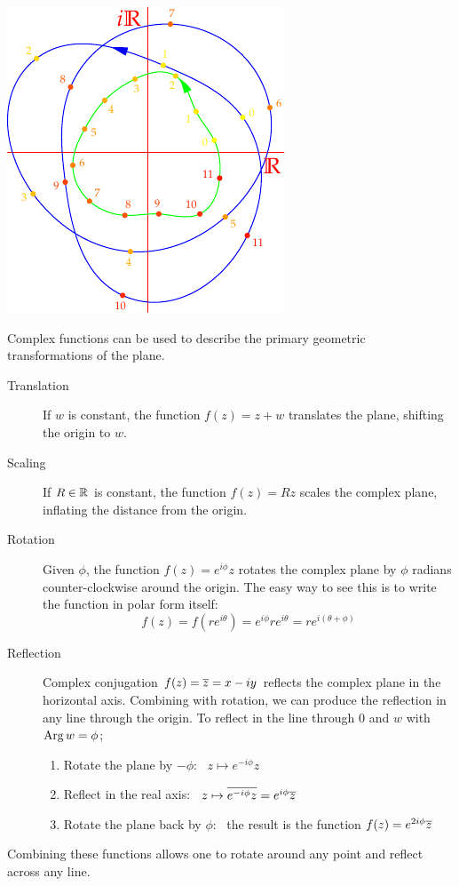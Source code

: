 \begin{examples}{}{}
\begin{minipage}[t]{0.33\linewidth}
\includegraphics{functions-zsq3}
\end{minipage}
\end{examples}

\label{pg:2dgeom}

Complex functions can be used to describe the primary geometric transformations of the plane.
\begin{description}
\item[Translation] If $w$ is constant, the function $f(z)=z+w$ translates the plane, shifting the origin to $w$.
\item[Scaling] If $R\in\mathbb{R}$ is constant, the function $f(z)=Rz$ scales the complex plane, inflating the distance from the origin.
\item[Rotation] Given $\phi$, the function $f(z)=e^{i\phi}z$ rotates the complex plane by $\phi$ radians counter-clockwise around the origin. The easy way to see this is to write the function in polar form itself:
\[f(z)=f(re^{i\theta})=e^{i\phi}re^{i\theta}=re^{i(\theta+\phi)}\]
\item[Reflection] Complex conjugation $f(z)=\overline{z}=x-iy$ reflects the complex plane in the horizontal axis. Combining with rotation, we can produce the reflection in any line through the origin. To reflect in the line through 0 and $w$ with $\operatorname{Arg} w=\phi$;
\begin{enumerate}
  \item Rotate the plane by $-\phi$: \ $z\mapsto e^{-i\phi}z$
  \item Reflect in the real axis: \ $z\mapsto \overline{e^{-i\phi}z}=e^{i\phi}\overline{z}$
  \item Rotate the plane back by $\phi$: \ the result is the function $f(z)=e^{2i\phi}\overline{z}$
\end{enumerate}
\end{description}
Combining these functions allows one to rotate around any point and reflect across any line.

